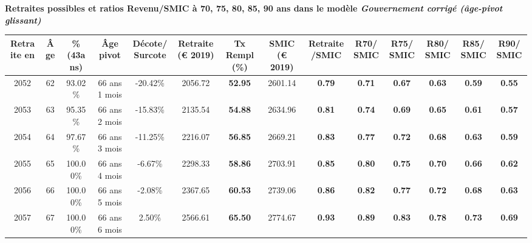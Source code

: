  \vspace{0.1cm} 
{\bf \noindent Retraites possibles et ratios Revenu/SMIC à 70, 75, 80, 85, 90 ans dans le modèle \emph{Gouvernement corrigé (âge-pivot glissant)}}  
 
\begin{adjustbox}{max width=\textwidth} 
\begin{tabular}[htb]{|c|c||c|c|c||c|c||c|c||c|c|c|c|c|} 
\hline 
 Retraite en &  Âge &  \%(43ans) &  Âge pivot &  Décote/Surcote &  Retraite (\euro{} 2019) &  Tx Rempl(\%) &  SMIC (\euro{} 2019) &  Retraite/SMIC &  R70/SMIC &  R75/SMIC &  R80/SMIC &  R85/SMIC &  R90/SMIC \\ 
\hline \hline 
 2052 &  62 &  93.02\% &  66 ans 1 mois &  -20.42\% &  2056.72 &  {\bf 52.95} &  2601.14 &  {\bf {\color{red} 0.79}} &  {\bf {\color{red} 0.71}} &  {\bf {\color{red} 0.67}} &  {\bf {\color{red} 0.63}} &  {\bf {\color{red} 0.59}} &  {\bf {\color{red} 0.55}} \\ 
\hline 
 2053 &  63 &  95.35\% &  66 ans 2 mois &  -15.83\% &  2135.54 &  {\bf 54.88} &  2634.96 &  {\bf {\color{red} 0.81}} &  {\bf {\color{red} 0.74}} &  {\bf {\color{red} 0.69}} &  {\bf {\color{red} 0.65}} &  {\bf {\color{red} 0.61}} &  {\bf {\color{red} 0.57}} \\ 
\hline 
 2054 &  64 &  97.67\% &  66 ans 3 mois &  -11.25\% &  2216.07 &  {\bf 56.85} &  2669.21 &  {\bf {\color{red} 0.83}} &  {\bf {\color{red} 0.77}} &  {\bf {\color{red} 0.72}} &  {\bf {\color{red} 0.68}} &  {\bf {\color{red} 0.63}} &  {\bf {\color{red} 0.59}} \\ 
\hline 
 2055 &  65 &  100.00\% &  66 ans 4 mois &  -6.67\% &  2298.33 &  {\bf 58.86} &  2703.91 &  {\bf {\color{red} 0.85}} &  {\bf {\color{red} 0.80}} &  {\bf {\color{red} 0.75}} &  {\bf {\color{red} 0.70}} &  {\bf {\color{red} 0.66}} &  {\bf {\color{red} 0.62}} \\ 
\hline 
 2056 &  66 &  100.00\% &  66 ans 5 mois &  -2.08\% &  2367.65 &  {\bf 60.53} &  2739.06 &  {\bf {\color{red} 0.86}} &  {\bf {\color{red} 0.82}} &  {\bf {\color{red} 0.77}} &  {\bf {\color{red} 0.72}} &  {\bf {\color{red} 0.68}} &  {\bf {\color{red} 0.63}} \\ 
\hline 
 2057 &  67 &  100.00\% &  66 ans 6 mois &  2.50\% &  2566.61 &  {\bf 65.50} &  2774.67 &  {\bf {\color{red} 0.93}} &  {\bf {\color{red} 0.89}} &  {\bf {\color{red} 0.83}} &  {\bf {\color{red} 0.78}} &  {\bf {\color{red} 0.73}} &  {\bf {\color{red} 0.69}} \\ 
\hline 
\hline 
\end{tabular} 
\end{adjustbox} 
 
